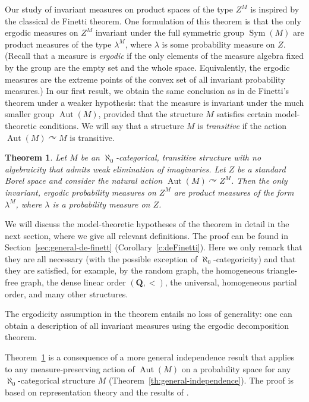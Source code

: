 \documentclass[JEP,XML,SOM,Unicode,published]{cedram}
\let\actson\curvearrowright
\theoremstyle{plain}
\newtheorem{theorem}{Theorem}[section]
\theoremstyle{definition}
\newcommand{\Q}{{\mathbf Q}}
\DeclareMathOperator{\Aut}{Aut}
\DeclareMathOperator{\Sym}{Sym}
\begin{document}
Our study of invariant measures on product spaces of the type $Z^M$ is inspired by the classical de Finetti theorem. One formulation of this theorem is that the only ergodic measures on $Z^M$ invariant under the full symmetric group $\Sym(M)$ are product measures of the type $\lambda^M$, where $\lambda$ is some probability measure on $Z$. (Recall that a measure is \emph{ergodic} if the only elements of the measure algebra fixed by the group are the empty set and the whole space. Equivalently, the ergodic measures are the extreme points of the convex set of all invariant probability measures.) In our first result, we obtain the same conclusion as in de Finetti's theorem under a weaker hypothesis: that the measure is invariant under the much smaller group $\Aut(M)$, provided that the structure $M$ satisfies certain model-theoretic conditions. We will say that a structure $M$ is \emph{transitive} if the action $\Aut(M) \actson M$ is transitive.

\begin{theorem}
\label{th:intro:deFinetti}
Let $M$ be an $\aleph_0$-categorical, transitive structure with no algebraicity that admits weak elimination of imaginaries. Let $Z$ be a standard Borel space and consider the natural action $\Aut(M) \actson Z^M$. Then the only invariant, ergodic probability measures on $Z^M$ are product measures of the form $\lambda^M$, where $\lambda$ is a probability measure on $Z$.
\end{theorem}
We will discuss the model-theoretic hypotheses of the theorem in detail in the next section, where we give all relevant definitions. The proof can be found in Section~\ref{sec:general-de-finett} (\cf Corollary~\ref{c:deFinetti}). Here we only remark that they are all necessary (with the possible exception of $\aleph_0$-categoricity) and that they are satisfied, for example, by the random graph, the homogeneous triangle-free graph, the dense linear order $(\Q, <)$, the universal, homogeneous partial order, and many other structures.

The ergodicity assumption in the theorem entails no loss of generality: one can obtain a description of all invariant measures using the ergodic decomposition theorem.

Theorem~\ref{th:intro:deFinetti} is a consequence of a more general independence result that applies to any measure-preserving action of $\Aut(M)$ on a probability space for any $\aleph_0$-categorical structure $M$ (\cf Theorem~\ref{th:general-independence}). The proof is based on representation theory and the results of \cite{Tsankov2012}.
\end{document}
